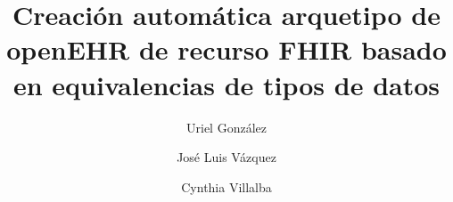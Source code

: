 \title{Creación automática arquetipo de openEHR de recurso FHIR basado en equivalencias de tipos de datos}

\author{Uriel González}

\author{José Luis Vázquez}

\author{Cynthia Villalba}
